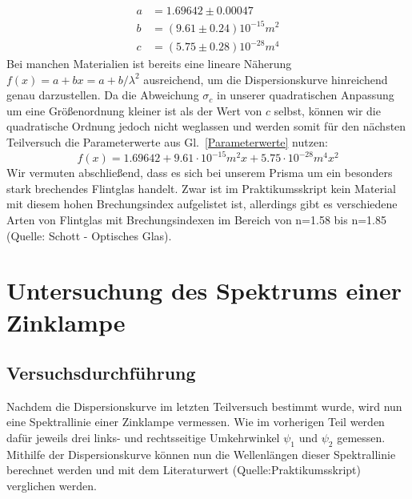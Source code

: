 \documentclass[12pt,a4paper]{article}
\begin{document}
\begin{align}\label{Parameterwerte}
a&=1.69642\pm0.00047\\
b&=(9.61\pm0.24)10^{-15}m^2\nonumber\\
c&=(5.75\pm0.28)10^{-28}m^4\nonumber
\end{align}
Bei manchen Materialien ist bereits eine lineare Näherung $f(x)=a+bx=a+b/\lambda^2$ ausreichend, um die Dispersionskurve hinreichend genau darzustellen. Da die Abweichung $\sigma_c$ in unserer quadratischen Anpassung um eine Größenordnung kleiner ist als der Wert von $c$ selbst, können wir die quadratische Ordnung jedoch nicht weglassen und werden somit für den nächsten Teilversuch die Parameterwerte aus Gl.~\eqref{Parameterwerte} nutzen:
\begin{equation}\label{eq:fitfunction}
f(x)=1.69642+9.61\cdot10^{-15}m^2x+5.75\cdot10^{-28}m^4x^2
\end{equation}
Wir vermuten abschließend, dass es sich bei unserem Prisma um ein besonders stark brechendes Flintglas handelt. Zwar ist im Praktikumsskript kein Material mit diesem hohen Brechungsindex aufgelistet ist, allerdings gibt es verschiedene Arten von Flintglas mit Brechungsindexen im Bereich von n=1.58 bis n=1.85 (Quelle: Schott - Optisches Glas).\\

\FloatBarrier
\section{Untersuchung des Spektrums einer Zinklampe}
\subsection{Versuchsdurchführung}
Nachdem die Dispersionskurve im letzten Teilversuch bestimmt wurde, wird nun eine Spektrallinie einer Zinklampe vermessen. Wie im vorherigen Teil werden dafür jeweils drei links- und rechtsseitige Umkehrwinkel $\psi_1$ und $\psi_2$ gemessen. Mithilfe der Dispersionskurve können nun die Wellenlängen dieser Spektrallinie berechnet werden und mit dem Literaturwert (Quelle:Praktikumsskript) verglichen werden.
\end{document}
